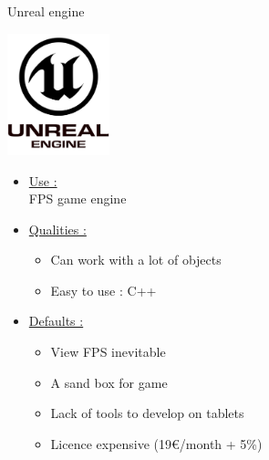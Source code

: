 \documentclass[a4paper,10pt]{beamer}
\begin{document}
			\begin{frame}{Unreal engine}
				\begin{multicols}{2}
				\includegraphics[height=100pt]{images/logos/Unreal_Engine.png}\\
				
				\columnbreak 
				
				 \begin{itemize}
				 	\item \underline{Use :}\\		
					 FPS game engine	 
					 \item \underline{Qualities :}\\
						 \begin{itemize}
						 	\item Can work with a lot of objects
						 	\item Easy to use : C++
						 \end{itemize}
				 \end{itemize}		 
				\end{multicols}
				\begin{itemize}
					\item \underline{Defaults :}\\
					\begin{itemize}
						\item View FPS inevitable
						\item A sand box for game
						\item Lack of tools to develop on tablets
						\item Licence expensive (19\euro/month + 5\%)
					\end{itemize}
				\end{itemize}
			\end{frame}
			
\end{document}
